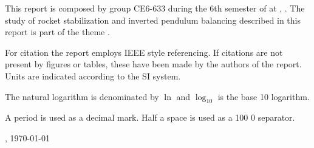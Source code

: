 
This report is composed by group CE6-633 during the 6th semester of \projectFaculty{} at \AAU{}, \the\year. The study of rocket stabilization and inverted pendulum balancing described in this report is part of the theme \textit{\projectTheme}. 

For citation the report employs IEEE style referencing. If citations are not present by figures or tables, these have been made by the authors of the report. Units are indicated according to the SI system.

The natural logarithm is denominated by $\ln$ and $\log_{10}$ is the base 10 logarithm.

A period is used as a decimal mark. Half a space is used as a 100 0 separator. 

\vspace{\baselineskip}\hfill \AAU, \today
\vfill\noindent

